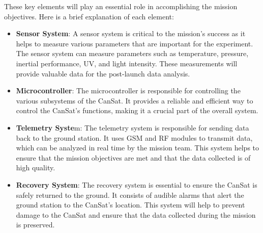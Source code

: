 These key elements will play an essential role in accomplishing the mission objectives. Here is a brief explanation of each element:
\begin{itemize}[leftmargin=1.27cm, itemindent=0cm, topsep=2pt, label=\faTasks]
    \item[\faThermometerQuarter] \textbf{Sensor System}: A sensor system is critical to the mission's success as it helps to measure various parameters that are important for the experiment. The sensor system can measure parameters such as temperature, pressure, inertial performance, UV, and light intensity. These measurements will provide valuable data for the post-launch data analysis.
    \item[\faMicrochip] \textbf{Microcontroller}: The microcontroller is responsible for controlling the various subsystems of the CanSat. It provides a reliable and efficient way to control the CanSat's functions, making it a crucial part of the overall system.
    \item[\faBroadcastTower] \textbf{Telemetry Syste}m: The telemetry system is responsible for sending data back to the ground station. It uses GSM and RF modules to transmit data, which can be analyzed in real time by the mission team. This system helps to ensure that the mission objectives are met and that the data collected is of high quality.
    \item[ \faParachuteBox] \textbf{Recovery System}: The recovery system is essential to ensure the CanSat is safely returned to the ground. It consists of audible alarms that alert the ground station to the CanSat's location. This system will help to prevent damage to the CanSat and ensure that the data collected during the mission is preserved.

\end{itemize}
